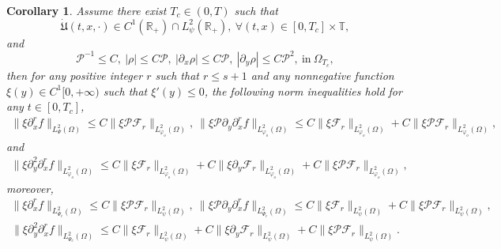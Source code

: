 \documentclass[10pt,a4paper]{amsart}
\newtheorem{corollary}{Corollary}
\begin{document}
\begin{corollary}\label{ncC2}
Assume there exist $T_{c}\in(0,T)$ such that
$$\dot{\mathfrak{U}}(t,x,\cdot)\in C^{1}(\mathbb{R}_{+})\cap L_{\psi}^{2}(\mathbb{R}_{+}),~\forall (t,x)\in[0,T_{c}]\times\mathbb{T},$$
and
$$\mathcal{P}^{-1}\leq C,~|\rho|\leq C\mathcal{P},~|\partial_{x}\rho|\leq C\mathcal{P},~|\partial_{y}\rho|\leq C\mathcal{P}^{2},~\text{in}~ \Omega_{T_{c}},$$
then for any positive integer $r$ such that $r\leq s+1$ and any nonnegative function $\xi(y)\in C^{1}[0,+\infty)$ such that $\xi'(y)\leq0$, the following norm inequalities hold for any $t\in[0,T_{c}]$,
\begin{align}\label{ncc21}
\|\xi\partial_{x}^{r}f\|_{L_{\Psi}^{2}(\Omega)}
\leq C\|\xi\mathcal{P}\mathcal{F}_{r}\|_{L_{\varphi_{o}}^{2}(\Omega)},~
\|\xi\mathcal{P}\partial_{y}\partial_{x}^{r}f\|_{L_{\varphi_{o}}^{2}(\Omega)}
\leq C\|\xi\mathcal{F}_{r}\|_{L_{\varphi_{o}}^{2}(\Omega)}
    +C\|\xi\mathcal{P}\mathcal{F}_{r}\|_{L_{\varphi_{o}}^{2}(\Omega)},
\end{align}
and
\begin{align}\label{ncc22}
\|\xi\partial_{y}^{2}\partial_{x}^{r}f\|_{L_{\varphi_{o}}^{2}(\Omega)}
\leq C\|\xi\mathcal{F}_{r}\|_{L_{\varphi_{o}}^{2}(\Omega)}
    +C\|\xi\partial_{y}\mathcal{F}_{r}\|_{L_{\varphi_{o}}^{2}(\Omega)}
    +C\|\xi\mathcal{P}\mathcal{F}_{r}\|_{L_{\varphi_{o}}^{2}(\Omega)},
\end{align}
moreover,
\begin{align}\label{ncc23}
\|\xi\partial_{x}^{r}f\|_{L_{\Psi_{c}}^{2}(\Omega)}
\leq C\|\xi\mathcal{P}\mathcal{F}_{r}\|_{L_{\psi}^{2}(\Omega)},~
\|\xi\mathcal{P}\partial_{y}\partial_{x}^{r}f\|_{L_{\Psi_{c}}^{2}(\Omega)}
\leq C\|\xi\mathcal{F}_{r}\|_{L_{\psi}^{2}(\Omega)}
    +C\|\xi\mathcal{P}\mathcal{F}_{r}\|_{L_{\psi}^{2}(\Omega)},
\end{align}
\begin{align}\label{ncc24}
\|\xi\partial_{y}^{2}\partial_{x}^{r}f\|_{L_{\Psi_{c}}^{2}(\Omega)}
\leq C\|\xi\mathcal{F}_{r}\|_{L_{\psi}^{2}(\Omega)}
    +C\|\xi\partial_{y}\mathcal{F}_{r}\|_{L_{\psi}^{2}(\Omega)}
    +C\|\xi\mathcal{P}\mathcal{F}_{r}\|_{L_{\psi}^{2}(\Omega)}.
\end{align}
\end{corollary}
\end{document}
